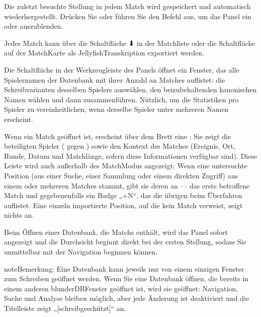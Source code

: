 \documentclass[letterpaper,10pt,german]{sphinxmanual}
\begin{document}
\sphinxAtStartPar
Die zuletzt besuchte Stellung in jedem Match wird gespeichert und automatisch wiederhergestellt. Drücken Sie  oder führen Sie den Befehl  aus, um das Panel ein\sphinxhyphen{} oder auszublenden.

\sphinxAtStartPar
Jedes Match kann über die Schaltfläche ⬇ in der Matchliste oder die Schaltfläche  auf der Match\sphinxhyphen{}Karte als Jellyfish\sphinxhyphen{}Transkription  exportiert werden.

\sphinxAtStartPar
Die Schaltfläche  in der Werkzeugleiste des Panels öffnet ein Fenster, das alle Spielernamen der Datenbank mit ihrer Anzahl an Matches auflistet: die Schreibvarianten desselben Spielers auswählen, den beizubehaltenden kanonischen Namen wählen und dann zusammenführen. Nützlich, um die Statistiken pro Spieler zu vereinheitlichen, wenn derselbe Spieler unter mehreren Namen erscheint.

\sphinxAtStartPar
Wenn ein Match geöffnet ist, erscheint über dem Brett eine : Sie zeigt die beteiligten Spieler ( gegen ) sowie den Kontext des Matches (Ereignis, Ort, Runde, Datum und Matchlänge, sofern diese Informationen verfügbar sind). Diese Leiste wird auch außerhalb des Match\sphinxhyphen{}Modus angezeigt: Wenn eine untersuchte Position (aus einer Suche, einer Sammlung oder einem direkten Zugriff) aus einem oder mehreren Matches stammt, gibt sie deren  an — das erste betroffene Match und gegebenenfalls ein Badge „+N“, das die übrigen beim Überfahren auflistet. Eine einzeln importierte Position, auf die kein Match verweist, zeigt nichts an.

\sphinxAtStartPar
Beim Öffnen einer Datenbank, die Matchs enthält, wird das Panel  sofort angezeigt und die Durchsicht beginnt direkt bei der ersten Stellung, sodass Sie unmittelbar mit der Navigation beginnen können.

\begin{sphinxadmonition}{note}{Bemerkung:}
\sphinxAtStartPar
Eine Datenbank kann jeweils nur von einem einzigen Fenster zum Schreiben geöffnet werden. Wenn Sie eine Datenbank öffnen, die bereits in einem anderen blunderDB\sphinxhyphen{}Fenster geöffnet ist, wird sie  geöffnet: Navigation, Suche und Analyse bleiben möglich, aber jede Änderung ist deaktiviert und die Titelleiste zeigt „{[}schreibgeschützt{]}“ an.
\end{sphinxadmonition}
\end{document}
